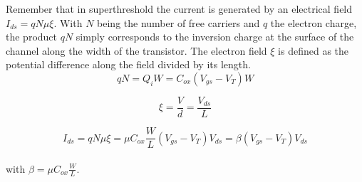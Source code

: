 Remember that in superthreshold the current is generated by an electrical field $I_{ds} = qN \mu \xi$. With $N$ being the number of free carriers and $q$ the electron charge, the product $qN$ simply corresponds to the inversion charge at the surface of the channel along the width of the transistor. The electron field $\xi$ is defined as the potential difference along the field divided by its length.\\

\begin{equation}
    qN = Q_i W = C_{ox} (V_{gs} - V_T) W
\end{equation}

\begin{equation}
    \xi = \frac{V}{d} = \frac{V_{ds}}{L}
\end{equation}

\begin{equation}
    I_{ds} = qN \mu \xi = \mu C_{ox} \frac{W}{L} (V_{gs} - V_T) V_{ds} = \beta (V_{gs} - V_T) V_{ds}
\end{equation}\\

with $\beta = \mu C_{ox} \frac{W}{L}$.